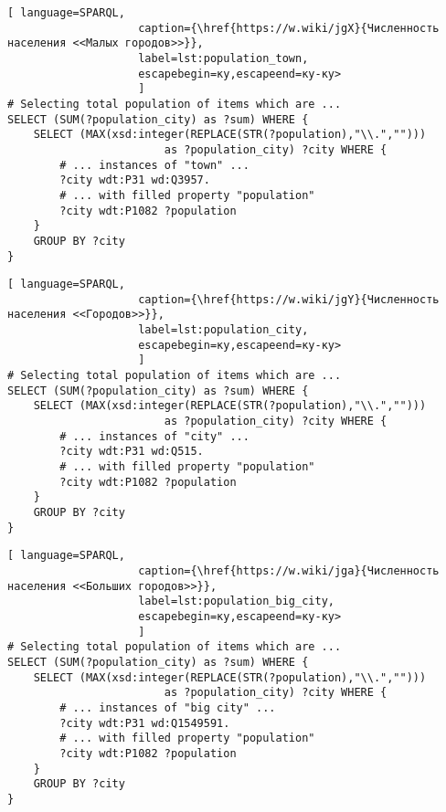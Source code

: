 \begin{lstlisting}[ language=SPARQL, 
                    caption={\href{https://w.wiki/jgX}{Численность населения <<Малых городов>>}},
                    label=lst:population_town, 
                    escapebegin=ку,escapeend=ку-ку>
                    ]
# Selecting total population of items which are ...
SELECT (SUM(?population_city) as ?sum) WHERE {                    
	SELECT (MAX(xsd:integer(REPLACE(STR(?population),"\\.",""))) 
						as ?population_city) ?city WHERE {
		# ... instances of "town" ...
		?city wdt:P31 wd:Q3957.
		# ... with filled property "population"                                       
		?city wdt:P1082 ?population                                   
	}
	GROUP BY ?city
}
\end{lstlisting}

\begin{lstlisting}[ language=SPARQL, 
                    caption={\href{https://w.wiki/jgY}{Численность населения <<Городов>>}},
                    label=lst:population_city, 
                    escapebegin=ку,escapeend=ку-ку>
                    ]
# Selecting total population of items which are ...
SELECT (SUM(?population_city) as ?sum) WHERE {                    
	SELECT (MAX(xsd:integer(REPLACE(STR(?population),"\\.",""))) 
						as ?population_city) ?city WHERE {
		# ... instances of "city" ...
		?city wdt:P31 wd:Q515.
		# ... with filled property "population"
		?city wdt:P1082 ?population
	}
	GROUP BY ?city
}\end{lstlisting}

\begin{lstlisting}[ language=SPARQL, 
                    caption={\href{https://w.wiki/jga}{Численность населения <<Больших городов>>}},
                    label=lst:population_big_city, 
                    escapebegin=ку,escapeend=ку-ку>
                    ]
# Selecting total population of items which are ...
SELECT (SUM(?population_city) as ?sum) WHERE {                    
	SELECT (MAX(xsd:integer(REPLACE(STR(?population),"\\.",""))) 
						as ?population_city) ?city WHERE {
		# ... instances of "big city" ...
		?city wdt:P31 wd:Q1549591.
		# ... with filled property "population"                                    
		?city wdt:P1082 ?population
	}
	GROUP BY ?city
}
\end{lstlisting}

